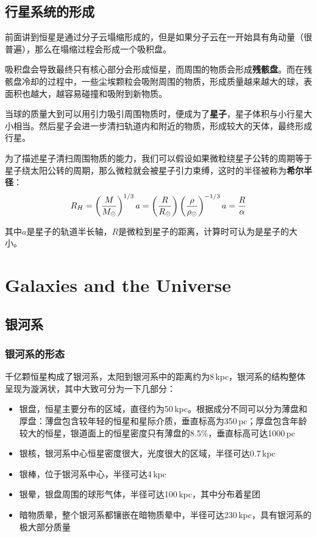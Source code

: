 \documentclass[openany]{ctexbook}
\begin{document}
\chapter{行星系统的形成}
前面讲到恒星是通过分子云塌缩形成的，但是如果分子云在一开始具有角动量（很普遍），那么在塌缩过程会形成一个吸积盘。

吸积盘会导致最终只有核心部分会形成恒星，而周围的物质会形成\textbf{残骸盘}。而在残骸盘冷却的过程中，一些尘埃颗粒会吸附周围的物质，形成质量越来越大的球，表面积也越大，越容易碰撞和吸附到新物质。

当球的质量大到可以用引力吸引周围物质时，便成为了\textbf{星子}，星子体积与小行星大小相当。然后星子会进一步清扫轨道内和附近的物质，形成较大的天体，最终形成行星。

为了描述星子清扫周围物质的能力，我们可以假设如果微粒绕星子公转的周期等于星子绕太阳公转的周期，那么微粒就会被星子引力束缚，这时的半径被称为\textbf{希尔半径}：
\begin{equation}
  R_H=\left({M\over M_\odot}\right)^{1/3}a=\left({R\over R_\odot}\right)\left({\rho \over \rho_\odot}\right)^{-1/3}a={R\over \alpha}
\end{equation}

其中$a$是星子的轨道半长轴，$R$是微粒到星子的距离，计算时可认为是星子的大小。

\part{Galaxies and the Universe}
\chapter{银河系}
\section{银河系的形态}
千亿颗恒星构成了银河系，太阳到银河系中的距离约为8\,kpc，银河系的结构整体呈现为漩涡状，其中大致可分为一下几部分：
\begin{itemize}
  \item 银盘，恒星主要分布的区域，直径约为50\,kpc。根据成分不同可以分为薄盘和厚盘：薄盘包含较年轻的恒星和星际介质，垂直标高为350\,pc；厚盘包含年龄较大的恒星，银道面上的恒星密度只有薄盘的8.5\%，垂直标高可达1000\,pc
  \item 银核，银河系中心恒星密度很大，光度很大的区域，半径可达0.7\,kpc
  \item 银棒，位于银河系中心，半径可达4\,kpc
  \item 银晕，银盘周围的球形气体，半径可达100\,kpc，其中分布着星团
  \item 暗物质晕，整个银河系都镶嵌在暗物质晕中，半径可达230\,kpc，具有银河系的极大部分质量
\end{itemize}
\end{document}

